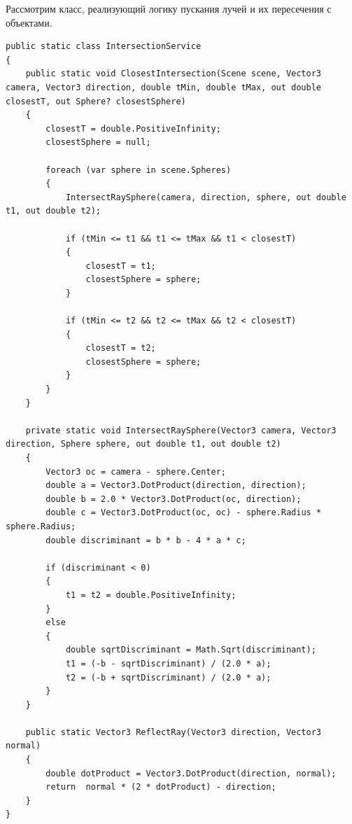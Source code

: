 Рассмотрим класс, реализующий логику пускания лучей и их пересечения с объектами.
\begin{lstlisting}[caption={Класс IntersectionService}, label={lst:3-2}]
public static class IntersectionService
{
	public static void ClosestIntersection(Scene scene, Vector3 camera, Vector3 direction, double tMin, double tMax, out double closestT, out Sphere? closestSphere)
	{
		closestT = double.PositiveInfinity;
		closestSphere = null;
		
		foreach (var sphere in scene.Spheres)
		{
			IntersectRaySphere(camera, direction, sphere, out double t1, out double t2);
			
			if (tMin <= t1 && t1 <= tMax && t1 < closestT)
			{
				closestT = t1;
				closestSphere = sphere;
			}
			
			if (tMin <= t2 && t2 <= tMax && t2 < closestT)
			{
				closestT = t2;
				closestSphere = sphere;
			}
		}
	}
	
	private static void IntersectRaySphere(Vector3 camera, Vector3 direction, Sphere sphere, out double t1, out double t2)
	{
		Vector3 oc = camera - sphere.Center;
		double a = Vector3.DotProduct(direction, direction);
		double b = 2.0 * Vector3.DotProduct(oc, direction);
		double c = Vector3.DotProduct(oc, oc) - sphere.Radius * sphere.Radius;
		double discriminant = b * b - 4 * a * c;
		
		if (discriminant < 0)
		{
			t1 = t2 = double.PositiveInfinity;
		}
		else
		{
			double sqrtDiscriminant = Math.Sqrt(discriminant);
			t1 = (-b - sqrtDiscriminant) / (2.0 * a);
			t2 = (-b + sqrtDiscriminant) / (2.0 * a);
		}
	}
	
	public static Vector3 ReflectRay(Vector3 direction, Vector3 normal)
	{
		double dotProduct = Vector3.DotProduct(direction, normal);
		return  normal * (2 * dotProduct) - direction;
	}
}
\end{lstlisting}

